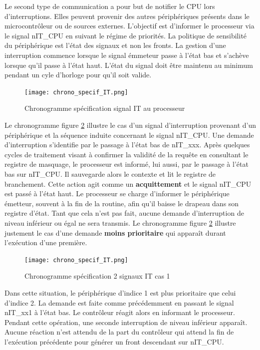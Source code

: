 \gap
Le second type de communication a pour but de notifier le \gls{CPU} lors d'interruptions.
Elles peuvent provenir des autres périphériques présents dans le microcontrôleur ou de sources externes.
L'objectif est d'informer le processeur via le signal nIT\_CPU en suivant le régime de priorités.
La politique de sensibilité du périphérique est l'état des signaux et non les fronts.
La gestion d'une interruption commence lorsque le signal émmeteur passe à l'état bas et s'achève lorsque  qu'il passe à l'état haut. 
L'état du signal doit être maintenu au minimum pendant un cyle d'horloge pour qu'il soit valide. %
\begin{figure}[H]
	\centering
	\texttt{[image: chrono\_specif\_IT.png]}
	\caption{Chronogramme spécification signal IT au processeur}
	\label{fig:spe_IT}
\end{figure}
Le chronogramme figure \ref{fig:spe_IT} illustre le cas d'un signal d'interruption provenant d'un périphérique et la séquence induite concernant le signal nIT\_CPU.
Une demande d'interruption s'identifie par le passage à l'état bas de nIT\_xxx. 
Après quelques cycles de traitement visant à confirmer la validité de la requête en consultant le registre de masquage, le processeur est informé, lui aussi, par le passage à l'état bas sur nIT\_CPU.
Il sauvegarde alors le contexte et lit le registre de branchement.
Cette action agit comme un \textbf{acquittement} et le signal nIT\_CPU est passé à l'état haut.
Le processeur se charge d'informer le périphérique émetteur, souvent à la fin de la routine, afin qu'il baisse le drapeau dans son registre d'état.
Tant que cela n'est pas fait, aucune demande d'interruption de niveau inférieur ou égal ne sera transmis.
Le chronogramme figure \ref{fig:spe_IT} illustre justement le cas d'une demande \textbf{moins prioritaire} qui apparaît durant l'exécution d'une première.
\begin{figure}[H]
	\centering
	\texttt{[image: chrono\_specif\_IT.png]}
	\caption{Chronogramme spécification 2 signaux IT cas 1}
	\label{fig:spe_IT}
\end{figure}
Dans cette situation, le périphérique d'indice 1 est plus prioritaire que celui d'indice 2. 
La demande est faite comme précédemment en passant le signal nIT\_xx1 à l'état bas.
Le contrôleur réagit alors en informant le processeur.
Pendant cette opération, une seconde interruption de niveau inférieur apparaît.
Aucune réaction n'est attendu de la part du contrôleur qui attend la fin de l'exécution précédente pour générer un front descendant sur nIT\_CPU.
